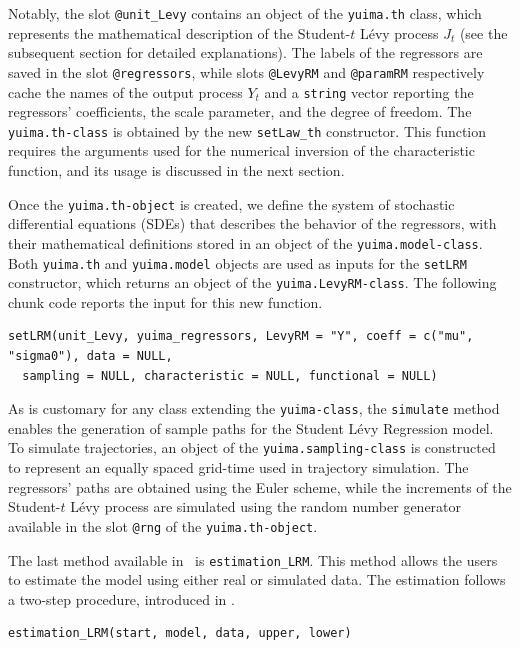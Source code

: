 Notably, the slot \texttt{@unit\_Levy} contains an object of the \texttt{yuima.th} class, which represents the mathematical description of the Student-\(t\) Lévy process \(J_t\) (see the subsequent section for detailed explanations). The labels of the regressors are saved in the slot \texttt{@regressors}, while slots \texttt{@LevyRM} and \texttt{@paramRM} respectively cache the names of the output process \(Y_t\) and a \texttt{string} vector reporting the regressors' coefficients, the scale parameter, and the degree of freedom. The \texttt{yuima.th-class} is obtained by the new \texttt{setLaw\_th} constructor. This function requires the arguments used for the numerical inversion of the characteristic function, and its usage is discussed in the next section.

Once the \texttt{yuima.th-object} is created, we define the system of stochastic differential equations (SDEs) that describes the behavior of the regressors, with their mathematical definitions stored in an object of the \texttt{yuima.model-class}. Both \texttt{yuima.th} and \texttt{yuima.model} objects are used as inputs for the \texttt{setLRM} constructor, which returns an object of the \texttt{yuima.LevyRM-class}. The following chunk code reports the input for this new function.

\begin{verbatim}
setLRM(unit_Levy, yuima_regressors, LevyRM = "Y", coeff = c("mu", "sigma0"), data = NULL,
  sampling = NULL, characteristic = NULL, functional = NULL)
\end{verbatim}

As is customary for any class extending the \texttt{yuima-class}, the \texttt{simulate} method enables the generation of sample paths for the Student Lévy Regression model. To simulate trajectories, an object of the \texttt{yuima.sampling-class} is constructed to represent an equally spaced grid-time used in trajectory simulation. The regressors' paths are obtained using the Euler scheme, while the increments of the Student-\(t\) Lévy process are simulated using the random number generator available in the slot \texttt{@rng} of the \texttt{yuima.th-object}.

The last method available in  ~is \texttt{estimation\_LRM}. This method allows the users to estimate the model using either real or simulated data. The estimation follows a two-step procedure, introduced in \citet{masuda2023quasilikelihood}.

\begin{verbatim}
estimation_LRM(start, model, data, upper, lower)
\end{verbatim}

